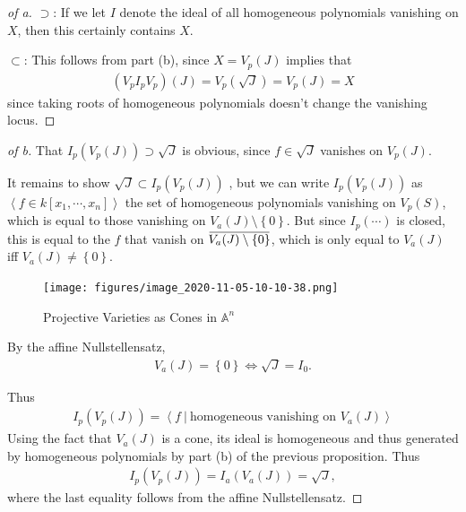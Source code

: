 \begin{proof}[of a]

\(\supset\): If we let \(I\) denote the ideal of all homogeneous
polynomials vanishing on \(X\), then this certainly contains \(X\).

\(\subset\): This follows from part (b), since \(X = V_p(J)\) implies
that
\begin{align*}
(V_p I_p V_p)(J) = V_p(\sqrt J) = V_p(J) = X
\end{align*}
since taking roots of homogeneous polynomials doesn't change the
vanishing locus.

\end{proof}

\begin{proof}[of b]

That \(I_p(V_p(J)) \supset \sqrt J\) is obvious, since \(f\in \sqrt{J}\)
vanishes on \(V_p(J)\). 

It remains to show \(\sqrt{J} \subset I_p(V_p(J))\) , but we can write
\(I_p(V_p(J))\) as
\(\left\langle{f \in k[x_1, \cdots, x_{n}]}\right\rangle\) the set of
homogeneous polynomials vanishing on \(V_p(S)\), which is equal to those
vanishing on \(V_a(J) \setminus\left\{{0}\right\}\). But since
\(I_p(\cdots)\) is closed, this is equal to the \(f\) that vanish on
\(\mkern 1.5mu\overline{\mkern-1.5muV_a(J)\setminus\left\{{0}\right\}\mkern-1.5mu}\mkern 1.5mu\),
which is only equal to \(V_a(J)\) iff
\(V_a(J) \neq \left\{{0}\right\}\).

\begin{figure}
\centering
\texttt{[image: figures/image\_2020-11-05-10-10-38.png]}
\caption{Projective Varieties as Cones in \({\mathbb{A}}^n\)}
\end{figure}

By the affine Nullstellensatz,
\begin{align*}  
V_a(J) = \left\{{0}\right\} \iff \sqrt{J} = I_0
.\end{align*}

Thus
\begin{align*}
I_p(V_p(J)) = \left\langle{f {~\mathrel{\Big|}~}\text{homogeneous vanishing on }V_a(J)}\right\rangle
\end{align*}
Using the fact that \(V_a(J)\) is a cone, its ideal is homogeneous and
thus generated by homogeneous polynomials by part (b) of the previous
proposition. Thus
\begin{align*}  
I_p(V_p(J)) = I_a(V_a(J)) = \sqrt J
,\end{align*}
where the last equality follows from the affine Nullstellensatz.

\end{proof}

